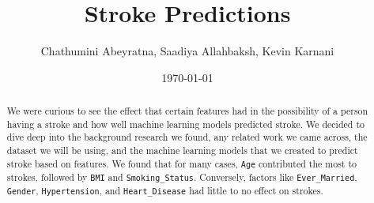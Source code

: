 \documentclass[12pt,letter]{article}
\begin{document}
    \title{Stroke Predictions} %
    \author{Chathumini Abeyratna, Saadiya Allahbaksh, Kevin Karnani}
    \date{\today} %
    \maketitle %


    \begin{abstract}
        \normalsize
        We were curious to see the effect that certain features had in the possibility of a person having a stroke and how well machine learning models predicted stroke. We decided to dive deep into the background research we found, any related work we came across, the dataset we will be using, and the machine learning models that we created to predict stroke based on features. We found that for many cases, \verb|Age| contributed the most to strokes, followed by \verb|BMI| and \verb|Smoking_Status|. Conversely, factors like \verb|Ever_Married|, \verb|Gender|, \verb|Hypertension|, and \verb|Heart_Disease| had little to no effect on strokes.

    \end{abstract}

    \setcounter{tocdepth}{5}
    \setcounter{secnumdepth}{5}
    \newpage
    \tableofcontents


    \clearpage

    
    
    
    
    
    
%
    \clearpage

%

    \clearpage
    {}
    
\end{document}
